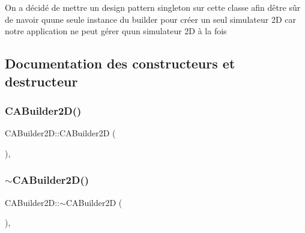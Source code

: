 On a décidé de mettre un design pattern singleton sur cette classe afin d\textquotesingle{}être sûr de n\textquotesingle{}avoir qu\textquotesingle{}une seule instance du builder pour créer un seul simulateur 2D car notre application ne peut gérer qu\textquotesingle{}un simulateur 2D à la fois 

\subsection{Documentation des constructeurs et destructeur}
\mbox{\label{class_c_a_builder2_d_a208cc4460b17fb33756e0e384c173760}} 
\subsubsection{\texorpdfstring{C\+A\+Builder2\+D()}{CABuilder2D()}\hspace{0.1cm}{\footnotesize\ttfamily [1/2]}}
{\footnotesize\ttfamily C\+A\+Builder2\+D\+::\+C\+A\+Builder2D (\begin{DoxyParamCaption}{ }\end{DoxyParamCaption})\hspace{0.3cm}{\ttfamily [inline]}, {\ttfamily [private]}}

\mbox{\label{class_c_a_builder2_d_a8f96127d2894b3a47fd32b8f23d073ba}} 
\subsubsection{\texorpdfstring{$\sim$\+C\+A\+Builder2\+D()}{~CABuilder2D()}}
{\footnotesize\ttfamily C\+A\+Builder2\+D\+::$\sim$\+C\+A\+Builder2D (\begin{DoxyParamCaption}{ }\end{DoxyParamCaption})\hspace{0.3cm}{\ttfamily [private]}, {\ttfamily [default]}}

\mbox{\label{class_c_a_builder2_d_a55cdd6483a571b716890d73ce4356c91}} 
